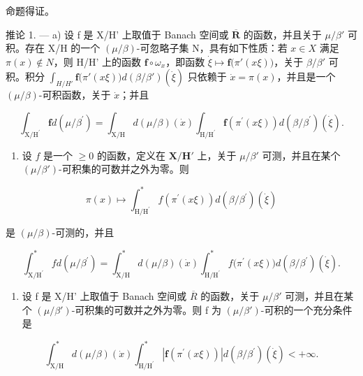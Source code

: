命题得证。

推论 1. --- a) 设 f 是 X/H' 上取值于 Banach 空间或 \(\overline{\mathbf{R}}\) 的函数，并且关于 \(\mu/\beta'\) 可积。存在 X/H 的一个 \((\mu/\beta)\)-可忽略子集 N，具有如下性质：若 \(x \in X\) 满足 \(\pi(x) \notin N\)，则 H/H' 上的函数 \(\mathbf{f} \circ \omega_x\)，即函数 \(\dot{\xi} \mapsto \mathbf{f}\big(\pi'(x\xi)\big)\)，关于 \(\beta/\beta'\) 可积。积分 \(\int_{H/H'} \mathbf{f}\big(\pi'(x\xi)\big)d(\beta/\beta')(\dot{\xi})\) 只依赖于 \(\dot{x} = \pi(x)\)，并且是一个 \((\mu/\beta)\)-可积函数，关于 \(\dot{x}\)；并且

\[
\int_ {\mathrm{X} / \mathrm{H} ^ {\prime}} \mathbf {f} d (\mu / \beta^ {\prime}) = \int_ {\mathrm{X} / \mathrm{H}} d (\mu / \beta) (\dot {x}) \int_ {\mathrm{H} / \mathrm{H} ^ {\prime}} \mathbf {f} \left(\pi^ {\prime} (x \xi)\right) d (\beta / \beta^ {\prime}) (\dot {\xi}).
\]

\begin{enumerate}
\def\labelenumi{\alph{enumi})}
\setcounter{enumi}{1}
\tightlist
\item
  设 \(f\) 是一个 \(\geqslant 0\) 的函数，定义在 \(\mathbf{X} / \mathbf{H}'\) 上，关于 \(\mu / \beta'\) 可测，并且在某个 \((\mu / \beta')\)-可积集的可数并之外为零。则
\end{enumerate}

\[
\pi (x) \mapsto \int_ {\mathrm{H} / \mathrm{H} ^ {\prime}} ^ {*} f (\pi^ {\prime} (x \xi)) d (\beta / \beta^ {\prime}) (\dot {\xi})
\]

是 \((\mu /\beta)\)-可测的，并且

\[
\int_ {\mathrm {X/ H^ {\prime}}} ^ {*} f d (\mu / \beta^ {\prime}) = \int_ {\mathrm{X/H}} ^ {*} d (\mu / \beta) (\dot {x}) \int_ {\mathrm {H/ H^ {\prime}}} ^ {*} f \bigl (\pi^ {\prime} (x \xi) \bigr) d (\beta / \beta^ {\prime}) (\dot {\xi}).
\]

\begin{enumerate}
\def\labelenumi{\alph{enumi})}
\setcounter{enumi}{2}
\tightlist
\item
  设 f 是 X/H' 上取值于 Banach 空间或 \(\overline{R}\) 的函数，关于 \(\mu/\beta'\) 可测，并且在某个 \((\mu/\beta')\)-可积集的可数并之外为零。则 f 为 \((\mu/\beta')\)-可积的一个充分条件是
\end{enumerate}

\[
\int_ {\mathrm{X} / \mathrm{H}} ^ {*} d (\mu / \beta) (\dot {x}) \int_ {\mathrm{H} / \mathrm{H} ^ {\prime}} ^ {*} | \mathbf {f} (\pi^ {\prime} (x \xi)) | d (\beta / \beta^ {\prime}) (\dot {\xi}) <   + \infty .
\]

